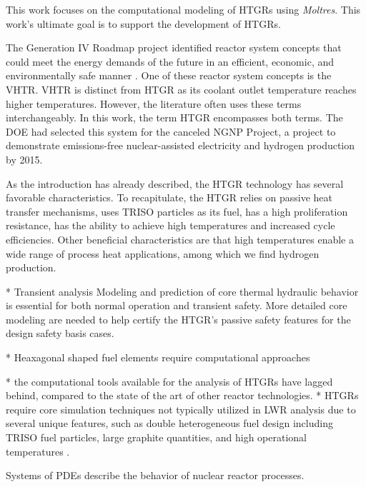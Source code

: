 \documentclass[11pt,letterpaper]{article}
\begin{document}
This work focuses on the computational modeling of \glspl{HTGR} using \textit{Moltres}.
This work's ultimate goal is to support the development of \glspl{HTGR}.

The Generation IV Roadmap project identified reactor system concepts that could meet the energy demands of the future in an efficient, economic, and environmentally safe manner \cite{macdonald_ngnp_2003}.
One of these reactor system concepts is the \gls{VHTR}.
\gls{VHTR} is distinct from \gls{HTGR} as its coolant outlet temperature reaches higher temperatures.
However, the literature often uses these terms interchangeably.
In this work, the term \gls{HTGR} encompasses both terms.
The \gls{DOE} had selected this system for the canceled \gls{NGNP} Project, a project to demonstrate emissions-free nuclear-assisted electricity and hydrogen production by 2015.

As the introduction has already described, the \gls{HTGR} technology has several favorable characteristics.
To recapitulate, the \gls{HTGR} relies on passive heat transfer mechanisms, uses TRISO particles as its fuel, has a high proliferation resistance, has the ability to achieve high temperatures and increased cycle efficiencies.
Other beneficial characteristics are that high temperatures enable a wide range of process heat applications, among which we find hydrogen production.

* Transient analysis
Modeling and prediction of core thermal hydraulic behavior is essential for both normal operation and transient safety.
More detailed core modeling are needed to help certify the \gls{HTGR}’s passive safety features for the design safety basis cases.

* Heaxagonal shaped fuel elements require computational approaches

* the computational tools available for the analysis of \glspl{HTGR} have lagged behind, compared to the state of the art of other reactor technologies.
* \glspl{HTGR} require core simulation techniques not typically utilized in \gls{LWR} analysis due to several unique features, such as double heterogeneous fuel design including \gls{TRISO} fuel particles, large graphite quantities, and high operational temperatures \cite{bostelmann_criticality_2016}.



Systems of \glspl{PDE} describe the behavior of nuclear reactor processes.
\end{document}
